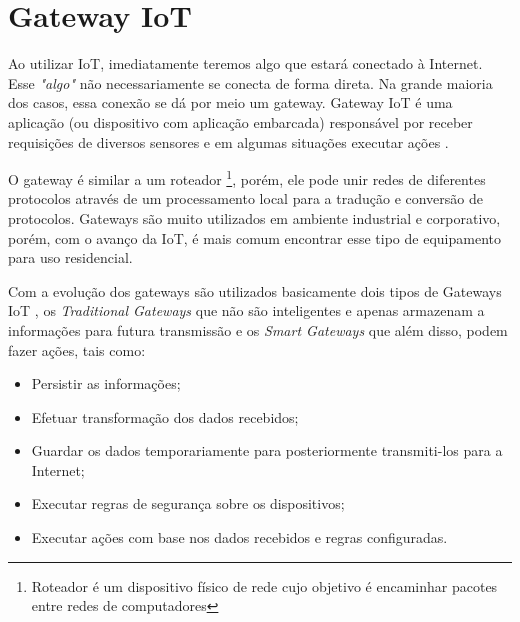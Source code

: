 \section{Gateway IoT}
\label{sec:iotGateway}

Ao utilizar IoT, imediatamente teremos algo que estará conectado à Internet. Esse \textit{"algo"} não necessariamente se conecta de forma direta. Na grande maioria dos casos, essa conexão se dá por meio um gateway. Gateway IoT é uma aplicação (ou dispositivo com aplicação embarcada) responsável por receber requisições de diversos sensores e em algumas situações executar ações \cite{ChenJiaLi}. 

O gateway é similar a um roteador \footnote{Roteador é um dispositivo físico de rede cujo objetivo é encaminhar pacotes entre redes de computadores}, porém, ele pode unir redes de diferentes protocolos através de um processamento local para a tradução e conversão de protocolos. Gateways são muito utilizados em ambiente industrial e corporativo, porém, com o avanço da IoT, é mais comum encontrar esse tipo de equipamento para uso residencial.

Com a evolução dos gateways são utilizados basicamente dois tipos de Gateways IoT \cite{WhatIsIotGateway}, os \textit{Traditional Gateways} que não são inteligentes e apenas armazenam a informações para futura transmissão e os \textit{Smart Gateways} que além disso, podem fazer ações, tais como:
\begin{itemize}
	\item Persistir as informações;
	\item Efetuar transformação dos dados recebidos;
	\item Guardar os dados temporariamente para posteriormente transmiti-los para a Internet;
	\item Executar regras de segurança sobre os dispositivos;
	\item Executar ações com base nos dados recebidos e regras configuradas.
\end{itemize}

